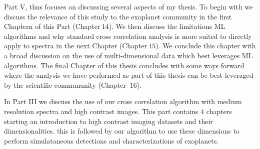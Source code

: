 Part V, thus focuses on discussing several aspects of my thesis. 
To begin with we discuss the relevance of this study to the exoplanet community in the first Chaptern of this Part (Chapter$~14$).
We then discuss the limitations ML algorithms and why standard cross correlation analysis is more suited to directly apply to spectra in the next Chapter (Chapter$~15$).
We conclude this chapter with a broad discussion on the use of multi-dimensional data which best leverages ML algorithms.
The final Chapter of this thesis concludes with some ways forward where the analysis we have performed as part of this thesis can be best leveraged by the scientific commununity (Chapter $~16$).  


In Part III we discuss the use of our cross correlation algorithm with medium resolution spectra and high contrast images.
This part contains $4$ chapters starting an introduction to high contrast imaging datasets and their dimensionalities.
this is followed by our algorithm to use these dimensions to perform simulataneous detections and characterizations of exoplanets.
